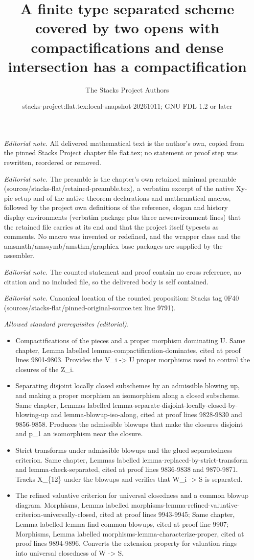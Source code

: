 \documentclass[10pt,a4paper]{amsart}
\title{A finite type separated scheme covered by two opens with compactifications and dense intersection has a compactification}
\author{The Stacks Project Authors}
\date{stacks-project:flat.tex:local-snapshot-20261011; GNU FDL 1.2 or later}
\theoremstyle{plain}
\theoremstyle{definition}
\theoremstyle{remark}
\numberwithin{equation}{subsection}
\begin{document}
\maketitle
\noindent\textit{Editorial note.} All delivered mathematical text is the author's own, copied from the pinned Stacks Project chapter file flat.tex; no statement or proof step was rewritten, reordered or removed.\par\medskip
\noindent\textit{Editorial note.} The preamble is the chapter's own retained minimal preamble (sources/stacks-flat/retained-preamble.tex), a verbatim excerpt of the native Xy-pic setup and of the native theorem declarations and mathematical macros, followed by the project own definitions of the reference, slogan and history display environments (verbatim package plus three newenvironment lines) that the retained file carries at its end and that the project itself typesets as comments. No macro was invented or redefined, and the wrapper class and the amsmath/amssymb/amsthm/graphicx base packages are supplied by the assembler.\par\medskip
\noindent\textit{Editorial note.} The counted statement and proof contain no cross reference, no citation and no included file, so the delivered body is self contained.\par\medskip
\noindent\textit{Editorial note.} Canonical location of the counted proposition: Stacks tag 0F40 (sources/stacks-flat/pinned-original-source.tex line 9791).\par\medskip
\noindent\textit{Allowed standard prerequisites (editorial).}\begin{itemize}
\item Compactifications of the pieces and a proper morphism dominating U. Same chapter, Lemma labelled lemma-compactification-dominates, cited at proof lines 9801-9803. Provides the V\_i -> U proper morphisms used to control the closures of the Z\_i.
\item Separating disjoint locally closed subschemes by an admissible blowing up, and making a proper morphism an isomorphism along a closed subscheme. Same chapter, Lemmas labelled lemma-separate-disjoint-locally-closed-by-blowing-up and lemma-blowup-iso-along, cited at proof lines 9828-9830 and 9856-9858. Produces the admissible blowups that make the closures disjoint and p\_1 an isomorphism near the closure.
\item Strict transforms under admissible blowups and the glued separatedness criterion. Same chapter, Lemmas labelled lemma-replaced-by-strict-transform and lemma-check-separated, cited at proof lines 9836-9838 and 9870-9871. Tracks X\_\{12\} under the blowups and verifies that W\_i -> S is separated.
\item The refined valuative criterion for universal closedness and a common blowup diagram. Morphisms, Lemma labelled morphisms-lemma-refined-valuative-criterion-universally-closed, cited at proof lines 9943-9945; Same chapter, Lemma labelled lemma-find-common-blowups, cited at proof line 9907; Morphisms, Lemma labelled morphisms-lemma-characterize-proper, cited at proof lines 9894-9896. Converts the extension property for valuation rings into universal closedness of W -> S.
\end{itemize}\medskip
\end{document}
